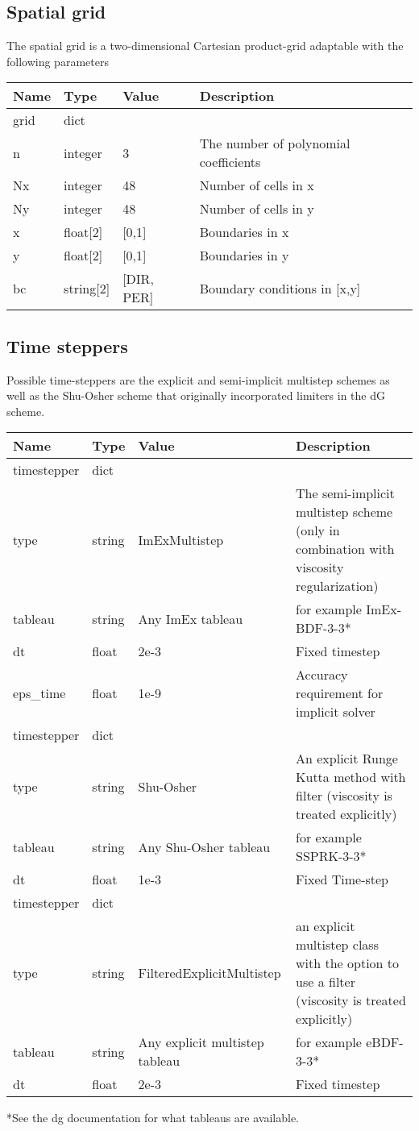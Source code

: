 \subsection{Spatial grid}
The spatial grid is a two-dimensional Cartesian product-grid adaptable with the following parameters
\begin{longtable}{llll}
\toprule
\rowcolor{gray!50}\textbf{Name} &  \textbf{Type} & \textbf{Value}  & \textbf{Description}  \\ \midrule
grid & dict & & \\
\qquad n  & integer & 3  & The number of polynomial coefficients \\
\qquad Nx & integer & 48 & Number of cells in x \\
\qquad Ny & integer & 48 & Number of cells in y \\
\qquad  x & float[2]& [0,1] & Boundaries in x \\
\qquad  y & float[2]& [0,1] & Boundaries in y \\
\qquad bc & string[2] & [DIR, PER] & Boundary conditions in [x,y] \\
\bottomrule
\end{longtable}
\subsection{Time steppers}
Possible time-steppers are the explicit and semi-implicit multistep schemes
as well as the Shu-Osher scheme that originally incorporated limiters in the dG scheme.
\begin{longtable}{lllp{6cm}}
\toprule
\rowcolor{gray!50}\textbf{Name} &  \textbf{Type} & \textbf{Value}  & \textbf{Description}  \\ \midrule
timestepper & dict & & \\
\qquad type     & string& ImExMultistep & The semi-implicit multistep scheme (only in combination with viscosity regularization) \\
\qquad tableau  & string & Any ImEx tableau & for example ImEx-BDF-3-3* \\
\qquad dt       & float & 2e-3 & Fixed timestep \\
\qquad eps\_time & float & 1e-9 & Accuracy requirement for implicit solver \\
timestepper & dict & & \\
\qquad type & string & Shu-Osher & An explicit Runge Kutta method with filter (viscosity is treated explicitly) \\
\qquad tableau   & string & Any Shu-Osher tableau & for example SSPRK-3-3* \\
\qquad dt      & float & 1e-3 & Fixed Time-step \\
timestepper & dict & & \\
\qquad type & string & FilteredExplicitMultistep & an explicit multistep class with the option to use a filter (viscosity is treated explicitly)\\
\qquad tableau   & string & Any explicit multistep tableau & for example eBDF-3-3* \\
\qquad dt      & float & 2e-3 & Fixed timestep \\
\bottomrule
\end{longtable}
*See the dg documentation for what tableaus are available.

